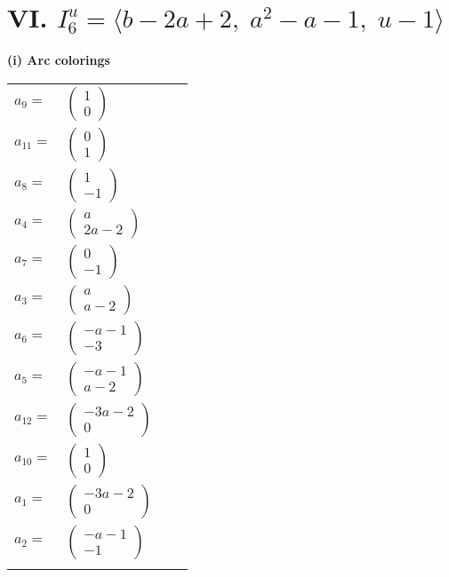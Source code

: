 \documentclass[1p]{elsarticle_modified}
\theoremstyle{definition}
\begin{document}
\centering \section*{VI. $I^u_{6}= \langle b-2 a+2,\;a^2- a-1,\;u-1 \rangle$}
\flushleft \textbf{(i) Arc colorings}\\
\begin{tabular}{m{7pt} m{180pt} m{7pt} m{180pt} }
\flushright $a_{9}=$&$\begin{pmatrix}1\\0\end{pmatrix}$ \\
\flushright $a_{11}=$&$\begin{pmatrix}0\\1\end{pmatrix}$ \\
\flushright $a_{8}=$&$\begin{pmatrix}1\\-1\end{pmatrix}$ \\
\flushright $a_{4}=$&$\begin{pmatrix}a\\2 a-2\end{pmatrix}$ \\
\flushright $a_{7}=$&$\begin{pmatrix}0\\-1\end{pmatrix}$ \\
\flushright $a_{3}=$&$\begin{pmatrix}a\\a-2\end{pmatrix}$ \\
\flushright $a_{6}=$&$\begin{pmatrix}- a-1\\-3\end{pmatrix}$ \\
\flushright $a_{5}=$&$\begin{pmatrix}- a-1\\a-2\end{pmatrix}$ \\
\flushright $a_{12}=$&$\begin{pmatrix}-3 a-2\\0\end{pmatrix}$ \\
\flushright $a_{10}=$&$\begin{pmatrix}1\\0\end{pmatrix}$ \\
\flushright $a_{1}=$&$\begin{pmatrix}-3 a-2\\0\end{pmatrix}$ \\
\flushright $a_{2}=$&$\begin{pmatrix}- a-1\\-1\end{pmatrix}$\\&\end{tabular}
\end{document}
